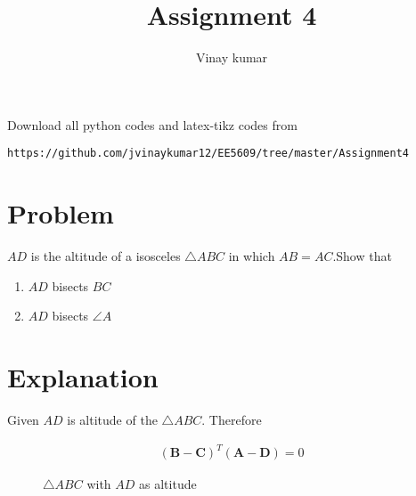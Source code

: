 \documentclass[journal,12pt,twocolumn]{IEEEtran}
\begin{document}
\makeatletter
{}
\makeatother
\let\StandardTheFigure\thefigure
\let\vec\mathbf
\renewcommand{\thefigure}{\theproblem}
\def\putbox#1#2#3{\makebox[0in][l]{\makebox[#1][l]{}\raisebox{\baselineskip}[0in][0in]{\raisebox{#2}[0in][0in]{#3}}}}
     \def\rightbox#1{\makebox[0in][r]{#1}}
     \def\centbox#1{\makebox[0in]{#1}}
     \def\topbox#1{\raisebox{-\baselineskip}[0in][0in]{#1}}
     \def\midbox#1{\raisebox{-0.5\baselineskip}[0in][0in]{#1}}
\vspace{3cm}
\title{Assignment 4}
\author{Vinay kumar}
\maketitle
\newpage
Download all python codes
and latex-tikz codes from 
%
\begin{lstlisting}
https://github.com/jvinaykumar12/EE5609/tree/master/Assignment4
\end{lstlisting}
%
\section{Problem}
$AD$ is the altitude of a isosceles $\triangle ABC$ in which $AB = AC$.Show that 
\begin{enumerate}
\item $AD$ bisects $BC$
\item $AD$ bisects $\angle A$
\end{enumerate}

\section{Explanation}

Given $AD$ is altitude of the $\triangle ABC$. Therefore

\begin{align}
(\vec{B}-\vec{C})^T(\vec{A}-\vec{D}) = 0
\label{eq:a0}
\end{align}


\begin{figure}[!ht] \label{fig:triangle_abc}
\centering
\resizebox{\columnwidth}{!}{}
\caption{$\triangle ABC$ with $AD$ as altitude}
\end{figure} 
\end{document}
